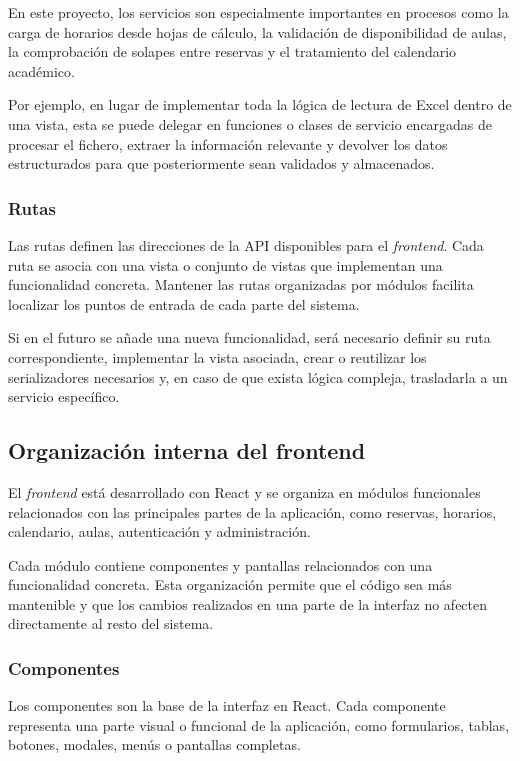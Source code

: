 En este proyecto, los servicios son especialmente importantes en procesos como la carga de horarios desde hojas de cálculo, la validación de disponibilidad de aulas, la comprobación de solapes entre reservas y el tratamiento del calendario académico.

Por ejemplo, en lugar de implementar toda la lógica de lectura de Excel dentro de una vista, esta se puede delegar en funciones o clases de servicio encargadas de procesar el fichero, extraer la información relevante y devolver los datos estructurados para que posteriormente sean validados y almacenados.

\subsubsection{Rutas}

Las rutas definen las direcciones de la API disponibles para el \textit{frontend}. Cada ruta se asocia con una vista o conjunto de vistas que implementan una funcionalidad concreta. Mantener las rutas organizadas por módulos facilita localizar los puntos de entrada de cada parte del sistema.

Si en el futuro se añade una nueva funcionalidad, será necesario definir su ruta correspondiente, implementar la vista asociada, crear o reutilizar los serializadores necesarios y, en caso de que exista lógica compleja, trasladarla a un servicio específico.

\subsection{Organización interna del frontend}

El \textit{frontend} está desarrollado con React y se organiza en módulos funcionales relacionados con las principales partes de la aplicación, como reservas, horarios, calendario, aulas, autenticación y administración.

Cada módulo contiene componentes y pantallas relacionados con una funcionalidad concreta. Esta organización permite que el código sea más mantenible y que los cambios realizados en una parte de la interfaz no afecten directamente al resto del sistema.

\subsubsection{Componentes}

Los componentes son la base de la interfaz en React. Cada componente representa una parte visual o funcional de la aplicación, como formularios, tablas, botones, modales, menús o pantallas completas.

